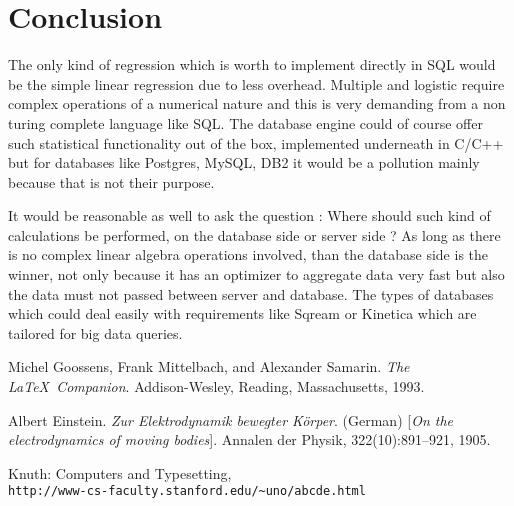 \documentclass[12pt]{article}
\begin{document}
\section{Conclusion}
The only kind of regression which is worth to implement directly in SQL would be the simple linear regression due to less overhead. Multiple and logistic require complex operations of a numerical nature and this is very demanding from a non turing complete language like SQL. The database engine could of course offer such statistical functionality out of the box, implemented underneath in C/C++ but for databases like Postgres, MySQL, DB2 it would be a pollution mainly because that is not their purpose.

It would be reasonable as well to ask the question : Where should such kind of calculations be performed, on the database side or server side ? 
As long as there is no complex linear algebra operations involved, than the database side is the winner, not only because it has an optimizer to aggregate data very fast but also the data must not passed between server and database.
The types of databases which could deal easily with requirements like Sqream or Kinetica which are tailored for big data queries. 



\begin{thebibliography}{9}
Michel Goossens, Frank Mittelbach, and Alexander Samarin. 
\textit{The \LaTeX\ Companion}. 
Addison-Wesley, Reading, Massachusetts, 1993.
 
Albert Einstein. 
\textit{Zur Elektrodynamik bewegter K{\"o}rper}. (German) 
[\textit{On the electrodynamics of moving bodies}]. 
Annalen der Physik, 322(10):891–921, 1905.
 
Knuth: Computers and Typesetting,
\\\texttt{http://www-cs-faculty.stanford.edu/\~{}uno/abcde.html}
\end{thebibliography}
\end{document}
